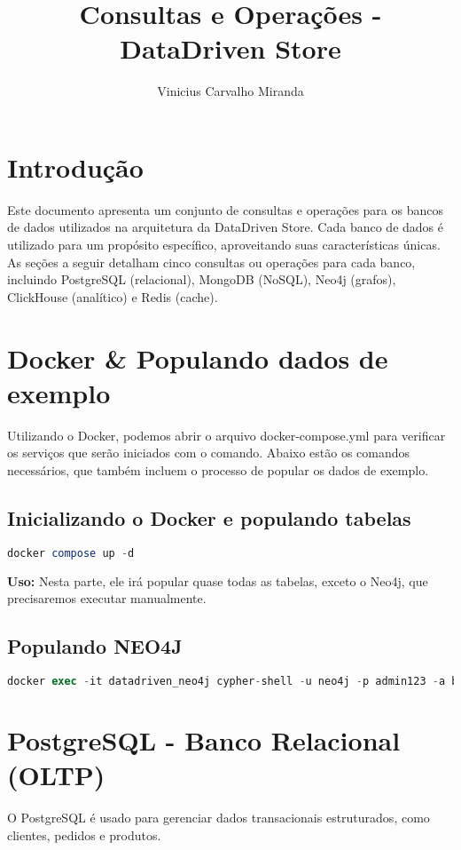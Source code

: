 \documentclass[a4paper,12pt]{article}
\title{Consultas e Operações - DataDriven Store}
\author{Vinicius Carvalho Miranda}
\begin{document}
\maketitle

\section{Introdução}
Este documento apresenta um conjunto de consultas e operações para os bancos de dados utilizados na arquitetura da DataDriven Store. Cada banco de dados é utilizado para um propósito específico, aproveitando suas características únicas. As seções a seguir detalham cinco consultas ou operações para cada banco, incluindo PostgreSQL (relacional), MongoDB (NoSQL), Neo4j (grafos), ClickHouse (analítico) e Redis (cache).

\section{Docker \& Populando dados de exemplo}
Utilizando o Docker, podemos abrir o arquivo docker-compose.yml para verificar os serviços que serão iniciados com o comando. Abaixo estão os comandos necessários, que também incluem o processo de popular os dados de exemplo.

\subsection{Inicializando o Docker e populando tabelas}
\begin{lstlisting}[language=SQL]
docker compose up -d
\end{lstlisting}
\textbf{Uso:} Nesta parte, ele irá popular quase todas as tabelas, exceto o Neo4j, que precisaremos executar manualmente.

\subsection{Populando NEO4J}
\begin{lstlisting}[language=SQL]
docker exec -it datadriven_neo4j cypher-shell -u neo4j -p admin123 -a bolt://localhost:7687 -d neo4j -f /var/lib/neo4j/import/neo4j_schema.cypher
\end{lstlisting}

\section{PostgreSQL - Banco Relacional (OLTP)}
O PostgreSQL é usado para gerenciar dados transacionais estruturados, como clientes, pedidos e produtos.
\end{document}
